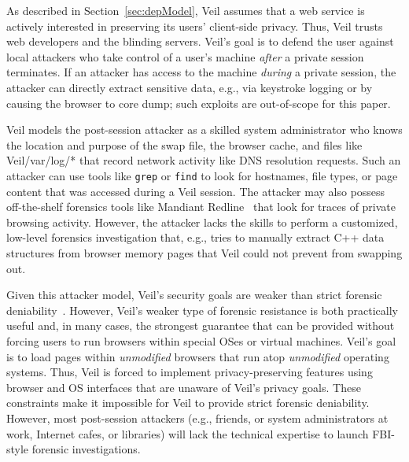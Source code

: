 As described in Section~\ref{sec:depModel}, Veil
assumes that a web service is actively interested
in preserving its users' client-side privacy.
Thus, Veil trusts web developers and the blinding servers.
Veil's goal is to defend the user against local
attackers who take control of a user's machine
\textit{after} a private session terminates. If an
attacker has access to the machine \emph{during} a
private session, the attacker can directly extract
sensitive data, e.g., via keystroke logging or by
causing the browser to core dump; such exploits are
out-of-scope for this paper.

Veil models the post-session attacker as a skilled
system administrator who knows the location and purpose
of the swap file, the browser cache, and files like
Veil{/var/log/*} that record network activity
like DNS resolution requests. Such an attacker can
use tools like \texttt{grep} or \texttt{find} to
look for hostnames, file types, or page content that
was accessed during a Veil session. The attacker
may also possess off-the-shelf forensics tools like
Mandiant Redline~\cite{mandiant} that look for traces
of private browsing activity. However, the attacker
lacks the skills to perform a customized, low-level
forensics investigation that, e.g., tries to manually
extract C++ data structures from browser memory
pages that Veil could not prevent from swapping out.

Given this attacker model, Veil's security goals are
weaker than strict forensic deniability~\cite{lacuna}.
However, Veil's weaker type of forensic resistance
is both practically useful and, in many cases, the
strongest guarantee that can be provided without
forcing users to run browsers within special OSes or
virtual machines. Veil's goal is to load pages within
\textit{unmodified} browsers that run atop
\textit{unmodified} operating systems. Thus, Veil
is forced to implement privacy-preserving features
using browser and OS interfaces that are unaware of
Veil's privacy goals. These constraints make it
impossible for Veil to provide strict forensic
deniability. However, most post-session attackers
(e.g., friends, or system administrators at work,
Internet cafes, or libraries) will
lack the technical expertise to launch FBI-style
forensic investigations.


